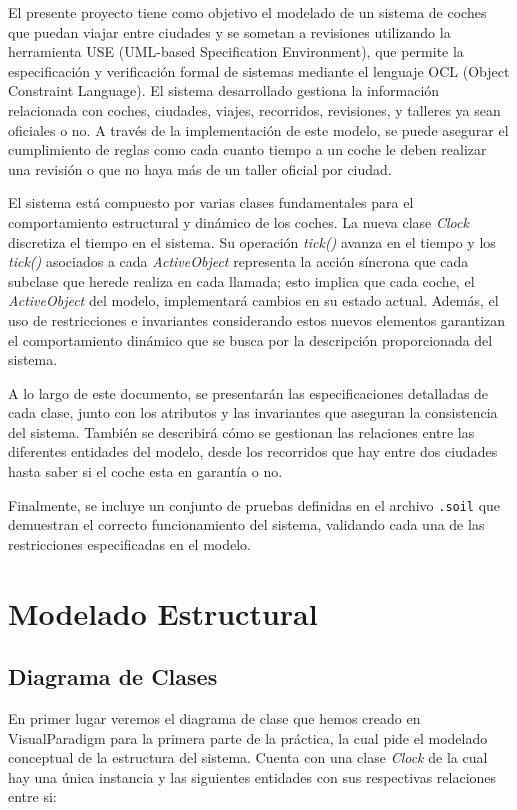 \documentclass[12pt.a4paper]{article}
\begin{document}
El presente proyecto tiene como objetivo el modelado de un sistema de coches que puedan viajar entre ciudades y se sometan a revisiones utilizando la herramienta USE (UML-based Specification Environment), que permite la especificación y verificación formal de sistemas mediante el lenguaje OCL (Object Constraint Language). El sistema desarrollado gestiona la información relacionada con coches, ciudades, viajes, recorridos, revisiones, y talleres ya sean oficiales o no. A través de la implementación de este modelo, se puede asegurar el cumplimiento de reglas como cada cuanto tiempo a un coche le deben realizar una revisión o que no haya más de un taller oficial por ciudad.
\vspace{0.5cm} 

El sistema está compuesto por varias clases fundamentales para el comportamiento estructural y dinámico de los coches. La nueva clase \emph{Clock} discretiza el tiempo en el sistema. Su operación \emph{tick()} avanza en el tiempo y los \emph{tick()} asociados a cada \emph{ActiveObject} representa la acción síncrona que cada subclase que herede realiza en cada llamada; esto implica que cada coche, el \emph{ActiveObject} del modelo, implementará cambios en su estado actual. Además, el uso de restricciones e invariantes considerando estos nuevos elementos garantizan el comportamiento dinámico que se  busca por la descripción proporcionada del sistema.
\vspace{0.5cm} 

A lo largo de este documento, se presentarán las especificaciones detalladas de cada clase, junto con los atributos y las invariantes que aseguran la consistencia del sistema. También se describirá cómo se gestionan las relaciones entre las diferentes entidades del modelo, desde los recorridos que hay entre dos ciudades hasta saber si el coche esta en garantía o no.
\vspace{0.5cm} 


Finalmente, se incluye un conjunto de pruebas definidas en el archivo \texttt{.soil} que demuestran el correcto funcionamiento del sistema, validando cada una de las restricciones especificadas en el modelo.
\vspace{1.0cm} 


\newpage

\section{Modelado Estructural}
\subsection{Diagrama de Clases}
En primer lugar veremos el diagrama de clase que hemos creado en VisualParadigm para la primera parte de la práctica, la cual pide el modelado conceptual de la estructura del sistema. Cuenta con una clase \emph{Clock} de la cual hay una única instancia y las siguientes entidades con sus respectivas relaciones entre si:
\end{document}

